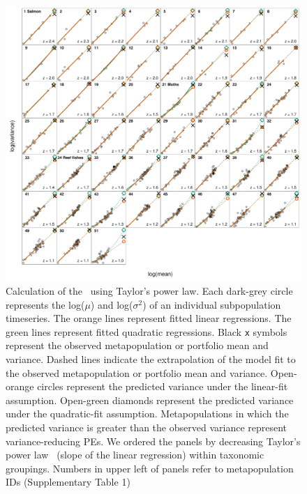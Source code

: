 \begin{figure}[htbp]
  \centering
  \includegraphics[width=\textwidth]{prophets/taylor-fits-scatter-20120720.pdf}
  \caption{ Calculation of the \tilmanPE\ using Taylor's power law. Each
    dark-grey circle  represents the log($\mu$) and log($\sigma^2$) of an
    individual subpopulation timeseries.  The orange lines represent fitted
    linear regressions.  The green lines represent fitted quadratic
    regressions.  Black \texttt{x} symbols represent the observed
    metapopulation or portfolio mean and variance.  Dashed lines indicate the
    extrapolation of the model fit to the observed metapopulation or portfolio
    mean and variance.  Open-orange circles represent the predicted variance
    under the linear-fit assumption.  Open-green diamonds represent the
    predicted variance under the quadratic-fit assumption.  Metapopulations in
    which the predicted variance is greater than the observed variance
    represent variance-reducing PEs.  We ordered the panels by decreasing
    Taylor's power law \zvalue\ (slope of the linear regression) within
    taxonomic groupings.  Numbers in upper left of panels refer to
    metapopulation IDs (Supplementary Table 1)}
\label{fig:Taylor-fits}
\end{figure}


